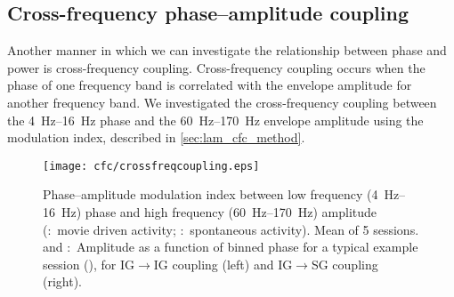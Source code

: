 

\subsection{Cross-frequency phase--amplitude coupling}
\label{sec:lam_cfc}

Another manner in which we can investigate the relationship between phase and power is cross-frequency coupling.
Cross-frequency coupling occurs when the phase of one frequency band is correlated with the envelope amplitude for another frequency band.
We investigated the cross-frequency coupling between the \SIrange{4}{16}{Hz} phase and the \SIrange{60}{170}{Hz} envelope amplitude using the modulation index, described in \autoref{sec:lam_cfc_method}.

\begin{figure}[tbp]
\subfloat{\label{fig:lam_cfc_movie}}
\subfloat{\label{fig:lam_cfc_spont}}
\subfloat{\label{fig:lam_cfc_movie_traces}}
\subfloat{\label{fig:lam_cfc_spont_traces}}
\centerline{
\texttt{[image: cfc/crossfreqcoupling.eps]}
}
%
\caption{
Phase--amplitude modulation index between low frequency (\SIrange{4}{16}{Hz}) phase and high frequency (\SIrange{60}{170}{Hz}) amplitude (\protect{}:~movie driven activity; \protect{}:~spontaneous activity).
Mean of \num{5} sessions.
\protect{} and \protect{}:~Amplitude as a function of binned phase for a typical example session (), for \ac{IG}$\rightarrow$\ac{IG} coupling (left) and \ac{IG}$\rightarrow$\ac{SG} coupling (right).}%
\label{fig:lam_8}
%
\end{figure}

